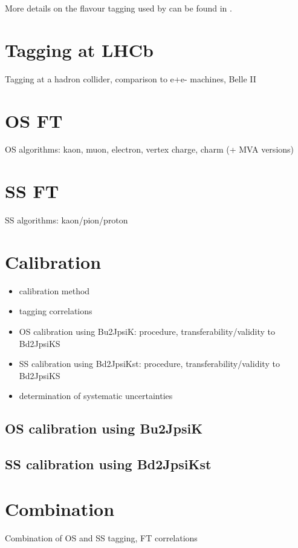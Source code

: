 More details on the flavour tagging used by \LHCb can be found in
\cite{Aaij:2012mu}.

\section{Tagging at LHCb}
\label{sec:flavour_tagging:lhcb}



Tagging at a hadron collider, comparison to e+e- machines, Belle II

\section{OS FT}
\label{sec:flavour_tagging:os}
OS algorithms: kaon, muon, electron, vertex charge, charm (+ MVA versions)

\section{SS FT}
\label{sec:flavour_tagging:ss}
SS algorithms: kaon/pion/proton

\section{Calibration}
\label{sec:flavour_tagging:calibration}
\begin{itemize}
  \item calibration method
  \item tagging correlations
  \item OS calibration using Bu2JpsiK: procedure, transferability/validity to Bd2JpsiKS
  \item SS calibration using Bd2JpsiKst: procedure, transferability/validity to Bd2JpsiKS
  \item determination of systematic uncertainties
\end{itemize}
\subsection{OS calibration using Bu2JpsiK}
\label{sec:flavour_tagging:calibration:os}
\subsection{SS calibration using Bd2JpsiKst}
\label{sec:flavour_tagging:calibration:ss}

\section{Combination}
\label{sec:flavour_tagging:combination}
Combination of OS and SS tagging, FT correlations

